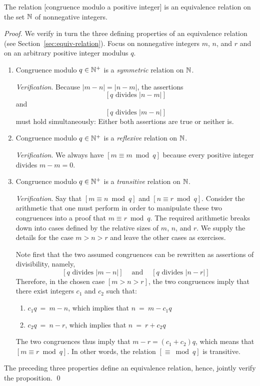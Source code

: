 \begin{prop}
\label{thm:CONGisEQUIVALENCE-REL}
The relation [congruence modulo a positive integer] is an equivalence relation on the set $\mathbb{N}$ of nonnegative integers.
\end{prop}

\begin{proof}
We verify in turn the three defining properties of an equivalence relation (see Section~\ref{sec:equiv-relation}).  Focus on nonnegative integers $m$, $n$, and $r$ and on an arbitrary positive integer modulus $q$.
\begin{enumerate}
\item
Congruence modulo $q \in \mathbb{N}^+$ is a {\em symmetric} relation on $\mathbb{N}$.

\smallskip

{\it Verification}.
Because $|m-n| = |n-m|$, the assertions
\[ [q \mbox{ divides } |n-m|] \]
and
\[ [q \mbox{ divides } |m-n|] \]
must hold simultaneously: Either both assertions are true or neither is.

\medskip\item
Congruence modulo $q \in \mathbb{N}^+$ is a {\em reflexive} relation on $\mathbb{N}$.

\smallskip

{\it Verification}.
We always have $[m \equiv m \bmod q]$ because every positive integer divides $m-m = 0$.

\medskip\item
Congruence modulo $q \in \mathbb{N}^+$ is a {\em transitive} relation on $\mathbb{N}$.

\smallskip

{\it Verification}.
Say that $[m \equiv n \bmod q]$ and $[n \equiv r \bmod q]$.  Consider the arithmetic that one must perform in order to manipulate these two congruences into a proof that $m \equiv r \bmod q$.   The required arithmetic breaks down into cases defined by the relative sizes of $m$, $n$, and $r$.  We supply the details for the case $m > n > r$ and leave the other cases as exercises.

\smallskip

Note first that the two assumed congruences can be rewritten as assertions of divisibility, namely, \[ [q \mbox{ divides } |m-n|] \ \ \ \ \mbox{ and } \ \ \ \ [q \mbox{ divides } |n-r|] \]
Therefore, in the chosen case $[m > n > r]$, the two congruences imply that there exist integers $c_1$ and $c_2$ such that:
  \begin{enumerate}
  \item
$c_1 q \ = \ m-n$, which implies that $n \ = \ m - c_1 q$
  \medskip\item
$c_2 q \ = \ n-r$, which implies that $n \ = \ r + c_2 q$
  \end{enumerate}
The two congruences thus imply that $m-r = (c_1 + c_2) q$, which means that $[m \equiv r
\bmod q]$.  In other words, the relation $[\equiv \bmod q]$ is transitive.
\end{enumerate}
The preceding three properties define an equivalence relation, hence, jointly verify the proposition. \qed
\end{proof}


